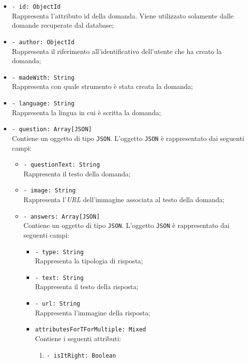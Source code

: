 \begin{itemize}
			\begin{itemize}
				\item \texttt{- id: ObjectId}\\
				Rappresenta l'attributo id della domanda. Viene utilizzato solamente dalle domande recuperate dal database;
				\item \texttt{- author: ObjectId}\\
				Rappresenta il riferimento all'identificativo dell'utente che ha creato la domanda;
				\item \texttt{- madeWith: String}\\ 
				Rappresenta con quale strumento è stata creata la domanda;
				\item \texttt{- language: String}\\
				Rappresenta la lingua in cui è scritta la domanda; 
				\item \texttt{- question: Array[JSON]}\\ 
				Contiene un oggetto di tipo \texttt{JSON}. L'oggetto \texttt{JSON} è rappresentato dai seguenti campi:
				\begin{itemize}
					\item \texttt{- questionText: String}\\ 
					Rappresenta il testo della domanda; 
					\item \texttt{- image: String}\\
					Rappresenta l'\textit{URL} dell'immagine associata al testo della domanda; 
					\item \texttt{- answers: Array[JSON]}\\ 
					Contiene un oggetto di tipo \texttt{JSON}. L'oggetto \texttt{JSON} è rappresentato dai seguenti campi:
					\begin{itemize}	
						\item \texttt{- type: String}\\
						Rappresenta la tipologia di risposta; 				  
						\item \texttt{- text: String}\\
						Rappresenta il testo della risposta;
						\item \texttt{- url: String}\\
						Rappresenta l'immagine della risposta;
						\item \texttt{attributesForTForMultiple: Mixed}\\
						Contiene i seguenti attributi:
						\begin{enumerate}
							\item \texttt{- isItRight: Boolean}\\

\end{enumerate}
\end{itemize}
\end{itemize}
\end{itemize}
\end{itemize}
